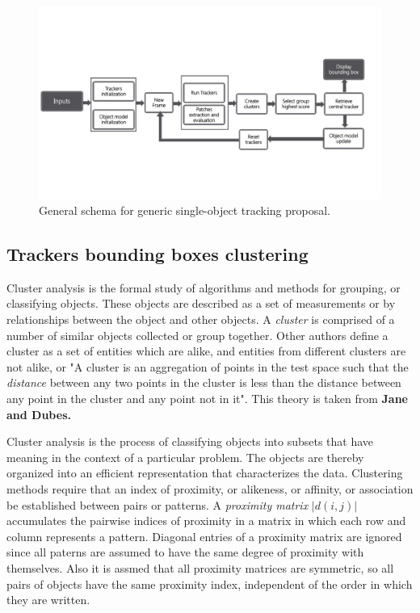 \begin{figure}[t!]
	\centering
		\includegraphics[width=1\linewidth, trim= 0cm 3cm 1cm 4cm, clip=true]{Figures/block_diagram.pdf}
	\caption{General schema for generic single-object tracking proposal.}
	\label{fig::diagram}
\end{figure}

\subsection{Trackers bounding boxes clustering}

Cluster analysis is the formal study of algorithms and methods for grouping, or classifying objects. These objects are described as a set of measurements or by relationships between the object and other objects. A \textit{cluster} is comprised of a number of similar objects collected or group together. Other authors define a cluster as a set of entities which are alike, and entities from different clusters are not alike, or "A cluster is an aggregation of points in the test space such that the \textit{distance} between any two points in the cluster is less than the distance between any point in the cluster and any point not in it". This theory is taken from \textbf{Jane and Dubes.}

Cluster analysis is the process of classifying objects into subsets that have meaning in the context of a particular problem. The objects are thereby organized into an efficient representation that characterizes the data. Clustering methods require that an index of proximity, or alikeness, or affinity, or association be established between pairs or patterns. A \textit{proximity matrix} $|d(i, j)|$ accumulates the pairwise indices of proximity in a matrix in which each row and column represents a pattern. Diagonal entries of a proximity matrix are ignored since all paterns are assumed to have the same degree of proximity with themselves. Also it is assmed that all proximity matrices are symmetric, so all pairs of objects have the same proximity index, independent of the order in which they are written.

